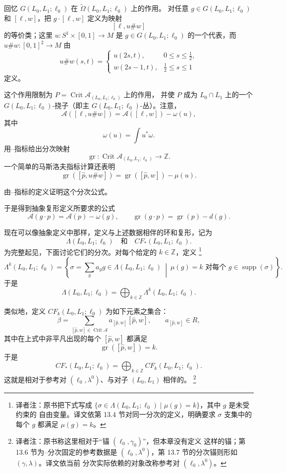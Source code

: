 回忆 $G(L_0,L_1;\ell_0)$ 在 $\widetilde\Omega(L_0,L_1;\ell_0)$ 上的作用。
对任意 $g\in G(L_0,L_1;\ell_0)$ 和 $[\ell,w]$，把
$g\cdot[\ell,w]$ 定义为映射
\[
  [\ell,u\#w]
\]
的等价类；这里 $u:S^1\times[0,1]\to M$ 是
$g\in G(L_0,L_1;\ell_0)$ 的一个代表，而
$u\#w:[0,1]^2\to M$ 由
\[
  u\#w(s,t)
  =
  \begin{cases}
    u(2s,t),&0\leq s\leq\frac12,\\
    w(2s-1,t),&\frac12\leq s\leq1
  \end{cases}
\]
定义。

这个作用限制为 $P=\operatorname{Crit}\mathcal A_{(L_0,L_1;\ell_0)}$ 上的作用，
并使 $P$ 成为 $L_0\cap L_1$ 上的一个 $G(L_0,L_1;\ell_0)$-挠子（即主
$G(L_0,L_1;\ell_0)$-丛）。注意，
\[
  \mathcal A([\ell,u\#w])
  =\mathcal A([\ell,w])-\omega(u),
\]
其中
\[
  \omega(u)=\int u^*\omega.
\]
用\personMaslov{}--\personMorse{}指标给出分次映射
\[
  \operatorname{gr}:
  \operatorname{Crit}\mathcal A_{(L_0,L_1;\ell_0)}
  \longrightarrow\mathbb Z.
\]
一个简单的马斯洛夫指标计算还表明
\[
  \operatorname{gr}([\widehat p,u\#w])
  =\operatorname{gr}([\widehat p,w])-\mu(u).
\]

\begin{exercise}
\label{ex:grading-under-annulus-action}
由\personMaslov{}--\personMorse{}指标的定义证明这个分次公式。
\end{exercise}

于是得到抽象\personFloer{}复形定义所要求的公式
\[
  \mathcal A(g\cdot p)=\mathcal A(p)-\omega(g),
  \qquad
  \operatorname{gr}(g\cdot p)=\operatorname{gr}(p)-d(g).
\]

现在可以像抽象定义中那样，定义与上述数据相伴的\personNovikov{}环和\personFloer{}复形，记为
\[
  \Lambda(L_0,L_1;\ell_0)
  \quad\text{和}\quad
  CF_*(L_0,L_1;\ell_0).
\]
为完整起见，下面讨论它们的分次。对每个给定的 $k\in\mathbb Z$，定义
\footnote{译者注：原书把下式写成
$\{\sigma\in\Lambda(L_0,L_1;\ell_0)\mid\mu(g)=k\}$，其中 $g$ 是未受约束的
自由变量。译文依第 13.4 节对同一分次的定义，明确要求 $\sigma$ 支集中的每个
$g$ 都满足 $\mu(g)=k$。}
\[
  \Lambda^k(L_0,L_1;\ell_0)
  =
  \left\{
    \sigma=\sum_g a_g g\in\Lambda(L_0,L_1;\ell_0)
    \ \middle|\
    \mu(g)=k\text{ 对每个 }g\in\operatorname{supp}(\sigma)
  \right\}.
\]
于是
\[
  \Lambda(L_0,L_1;\ell_0)
  =
  \bigoplus_{k\in\mathbb Z}\Lambda^k(L_0,L_1;\ell_0).
\]

类似地，定义 $CF_k(L_0,L_1;\ell_0)$ 为如下元素之集合：
\[
  \beta
  =
  \sum_{[\widehat p,w]\in\operatorname{Crit}\mathcal A}
    a_{[\widehat p,w]}[\widehat p,w],
  \qquad
  a_{[\widehat p,w]}\in R,
\]
其中在上式中非平凡出现的每个 $[\widehat p,w]$ 都满足
\[
  \operatorname{gr}([\widehat p,w])=k.
\]
于是
\[
  CF_*(L_0,L_1;\ell_0)
  =
  \bigoplus_{k\in\mathbb Z}CF_k(L_0,L_1;\ell_0).
\]
这就是相对于参考对 $(\ell_0,\lambda^0)$、与对子 $(L_0,L_1)$ 相伴的\termFloerChainModule{}。
\footnote{译者注：原书称这里相对于“锚 $(\ell_0,\gamma_0)$”，但本章没有定义
这样的锚；第 13.6 节为\personMaslov{}--\personMorse{}分次固定的参考数据是
$(\ell_0,\lambda^0)$，第 13.7 节的分次锚则形如 $(\gamma,\lambda)$。译文依当前
分次实际依赖的对象改称参考对 $(\ell_0,\lambda^0)$。}

